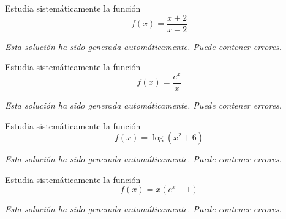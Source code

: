 \documentclass[nochap,palatino,nobuilddate]{estudioFuncion}
\newcommand{\newexample}[1]{
	\section{Análisis sistemático de una función}
	Analiza sistemáticamente la siguiente función:
	
	\begin{mdframed}
	\[f(x) = \sagestr{latex(f(x))}\]
	\end{mdframed}
	
	\newpage
}
\begin{document}
\begin{problem} Estudia sistemáticamente la función
	\[
		f(x)=\frac{x+2}{x-2}
	\]
\solution

\textit{Esta solución ha sido generada automáticamente. Puede contener errores.}


\end{problem}


\begin{problem} Estudia sistemáticamente la función
	\[
		f(x)=\frac{e^x}{x}
	\]
\solution

\textit{Esta solución ha sido generada automáticamente. Puede contener errores.}


\end{problem}

\begin{problem} Estudia sistemáticamente la función
	\[
		f(x)=\log(x^2+6)
	\]
\solution

\textit{Esta solución ha sido generada automáticamente. Puede contener errores.}


\end{problem}

\begin{problem} Estudia sistemáticamente la función
	\[
		f(x)=x(e^x-1)
	\]
\solution

\textit{Esta solución ha sido generada automáticamente. Puede contener errores.}


\end{problem}

\end{document}
